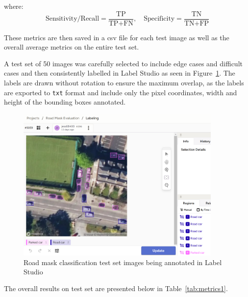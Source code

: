 where:
\[
\text{Sensitivity/Recall} = \frac{\text{TP}}{\text{TP} + \text{FN}}, \quad
\text{Specificity} = \frac{\text{TN}}{\text{TN} + \text{FP}}
\]

These metrics are then saved in a csv file for each test image as well as the overall average metrics on the entire test set.

A test set of 50 images was carefully selected to include edge cases and difficult cases and then consistently labelled in Label Studio as seen in Figure~\ref{fig:LabelStudio_test_set}. The labels are drawn without rotation to ensure the maximum overlap, as the labels are exported to \texttt{txt} format and include only the pixel coordinates, width and  height of the bounding boxes annotated.

\begin{figure}[htbp]
    \centering
    \includegraphics[width=0.9\textwidth]{images/label_studio4.png}
    \caption{Road mask classification test set images being annotated in Label Studio}
    \label{fig:LabelStudio_test_set}
\end{figure}

\newpage{}


The overall results on test set are presented below in Table~\ref{tab:metrics1}.

